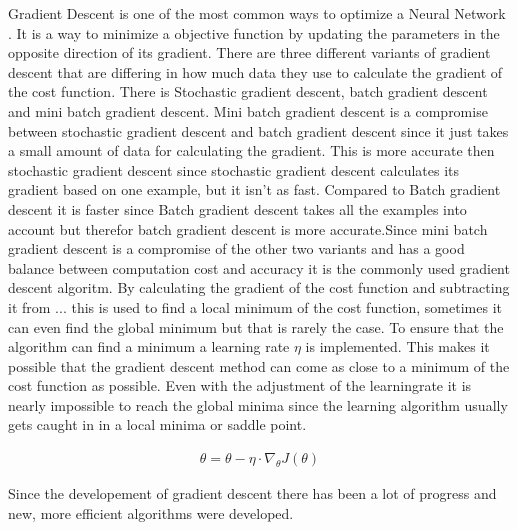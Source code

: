 \documentclass[
a4paper, 
12pt,
grayscalebody, %
abstract=on,
twoside, BCOR10mm, 12pt, DIV13,headinclude, footexclude, final, abstracton, openright
]{ibireprt}
\numberwithin{equation}{chapter}
\numberwithin{table}{chapter}
\numberwithin{figure}{chapter}
\numberwithin{algorithm}{chapter}
\numberwithin{example}{chapter}
\numberwithin{example}{chapter}
\begin{document}
Gradient Descent is one of the most common ways to optimize a Neural Network \cite{Ruder2016}. It is a way to minimize a objective function by updating the parameters in the opposite direction of its gradient. There are three different variants of gradient descent that are differing in how much data they use to calculate the gradient of the cost function. There is Stochastic gradient descent, batch gradient descent and mini batch gradient descent. 
Mini batch gradient descent is a compromise between stochastic gradient descent and batch gradient descent since it just takes a small amount of data for calculating the gradient. This is more accurate then stochastic gradient descent since stochastic gradient descent calculates its gradient based on one example, but it isn't as fast. Compared to Batch gradient descent it is faster since Batch gradient descent takes all the examples into account but therefor batch gradient descent is more accurate.Since mini batch gradient descent is a compromise of the other two variants and has a good balance between computation cost and accuracy it is the commonly used gradient descent algoritm. By calculating the gradient of the cost function and subtracting it from ... %
 this is used to find a local minimum of the cost function, sometimes it can even find the global minimum but that is rarely the case. To ensure that the algorithm can find a minimum a learning rate $\eta$ is implemented. This makes it possible that the gradient descent method can come as close to a minimum of the cost function as possible. Even with the adjustment of the learningrate it is nearly impossible to reach the global minima since the learning algorithm usually gets caught in in a local minima or saddle point. %
 
\begin{align}
	\theta = \theta - \eta \cdot \nabla_\theta J(\theta)
\end{align}


 Since the developement of gradient descent there has been a lot of progress and new, more efficient algorithms were developed. 
\end{document}
